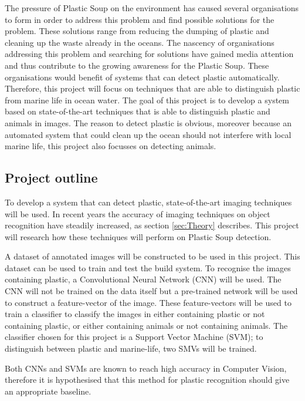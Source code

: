 The pressure of Plastic Soup on the environment has caused several organisations to form in order to address this problem and find possible solutions for the problem.
These solutions range from reducing the dumping of plastic and cleaning up the waste already in the oceans.
The nascency of organisations addressing this problem and searching for solutions have gained media attention and thus contribute to the growing awareness for the Plastic Soup.
These organisations would benefit of systems that can detect plastic automatically.
Therefore, this project will focus on techniques that are able to distinguish plastic from marine life in ocean water.
The goal of this project is to develop a system based on state-of-the-art techniques that is able to distinguish plastic and animals in images.
The reason to detect plastic is obvious, moreover because an automated system that could clean up the ocean should not interfere with local marine life, this project also focusses on detecting animals.

\subsection{Project outline}
\label{sec:Intro-Me}
To develop a system that can detect plastic, state-of-the-art imaging techniques will be used.
In recent years the accuracy of imaging techniques on object recognition have steadily increased, as section \ref{sec:Theory} describes.
This project will research how these techniques will perform on Plastic Soup detection.

A dataset of annotated images will be constructed to be used in this project.
This dataset can be used to train and test the build system.
To recognise the images containing plastic, a Convolutional Neural Network (CNN) will be used.
The CNN will not be trained on the data itself but a pre-trained network will be used to construct a feature-vector of the image.
These feature-vectors will be used to train a classifier to classify the images in either containing plastic or not containing plastic, or either containing animals or not containing animals.
The classifier chosen for this project is a Support Vector Machine (SVM); to distinguish between plastic and marine-life, two SMVs will be trained.

Both CNNs and SVMs are known to reach high accuracy in Computer Vision, therefore it is hypothesised that this method for plastic recognition should give an appropriate baseline.

